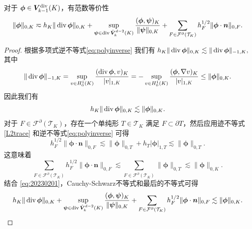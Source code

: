 \begin{lemma}\label{lem:Vkm1divnormequivalence}
对于 $\boldsymbol{\phi}\in\boldsymbol{V}_{k-1}^{\rm div}(K)$，有范数等价性
\begin{equation}\label{eq:Vkm1divnormequivalence}
\|\boldsymbol{\phi}\|_{0,K}\eqsim h_K\|\operatorname{div}\boldsymbol{\phi}\|_{0,K} + \sup_{\boldsymbol{\psi}\in\operatorname{div}\mathring{\boldsymbol{V}}_{k}^{d-2}(K)}\frac{(\boldsymbol{\phi}, \boldsymbol{\psi})_K}{\|\boldsymbol{\psi}\|_{0,K}} +\sum_{F\in\mathcal F^{\partial}(\mathcal T_K)}h_F^{1/2}\|\boldsymbol{\phi}\cdot\boldsymbol{n}\|_{0,F}.
\end{equation}
\end{lemma}
\begin{proof}
根据多项式逆不等式\eqref{eq:polyinverse} 我们有 
$
h_K\|\operatorname{div}\boldsymbol{\phi}\|_{0,K}\lesssim  \|\operatorname{div}\boldsymbol{\phi}\|_{-1,K},
$
其中
$$
\|\operatorname{div}\boldsymbol{\phi}\|_{-1,K}=\sup_{v\in H_0^1(K)}\frac{(\operatorname{div}\boldsymbol{\phi}, v)_K}{|v|_{1,K}}=-\sup_{v\in H_0^1(K)}\frac{(\boldsymbol{\phi}, \nabla v)_K}{|v|_{1,K}} \leq \|\boldsymbol{\phi}\|_{0,K}.
$$
因此我们有
\begin{equation}\label{eq:20230201}
h_K\|\operatorname{div}\boldsymbol{\phi}\|_{0,K}\lesssim \|\boldsymbol{\phi}\|_{0,K}.
\end{equation}
对于 $F\in\mathcal F^{\partial}(\mathcal T_K)$，存在一个单纯形 $T\in\mathcal
T_K$ 满足 $F\subset\partial T$，然后应用迹不等式 \eqref{L2trace} 
和逆不等式\eqref{eq:polyinverse} 可得
$$
h_F^{1/2}\|\boldsymbol{\phi}\cdot\boldsymbol{n}\|_{0,F} \lesssim \|\boldsymbol{\phi}\|_{0,T}+h_T|\boldsymbol{\phi}|_{1,T}\lesssim \|\boldsymbol{\phi}\|_{0,T}.
$$
这意味着
$$
\sum_{F\in\mathcal F^{\partial}(\mathcal T_K)}h_F^{1/2}\|\boldsymbol{\phi}\cdot\boldsymbol{n}\|_{0,F} \lesssim \sum_{F\in\mathcal F^{\partial}(\mathcal T_K)}\|\boldsymbol{\phi}\|_{0,T}\lesssim \|\boldsymbol{\phi}\|_{0,K}.
$$
结合 \eqref{eq:20230201}，Cauchy-Schwarz不等式和最后的不等式可得
$$
h_K\|\operatorname{div}\boldsymbol{\phi}\|_{0,K}+\sup_{\boldsymbol{\psi}\in\operatorname{div}\mathring{\boldsymbol{V}}_{k}^{d-2}(K)}\frac{(\boldsymbol{\phi}, \boldsymbol{\psi})_K}{\|\boldsymbol{\psi}\|_{0,K}} +\sum_{F\in\mathcal F^{\partial}(\mathcal T_K)}h_F^{1/2}\|\boldsymbol{\phi}\cdot\boldsymbol{n}\|_{0,F}\lesssim \|\boldsymbol{\phi}\|_{0,K}.
$$


\end{proof}

